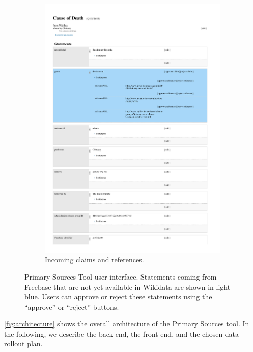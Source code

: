 \documentclass{sig-alternate-2013}
\begin{document}
\begin{figure}[!t]
\begin{subfigure}[b]{1.0\columnwidth}
        \includegraphics[width=\textwidth]{img/wikidata-cause-of-death.pdf}
        \caption{Incoming claims and references.}
        \label{fig:cause-of-death}
    \end{subfigure}
    \caption{Primary Sources Tool user interface. Statements coming from
       Freebase that are not yet available in Wikidata are shown in light blue.
       Users can approve or reject these statements using the ``approve'' or ``reject'' buttons.}
    \label{fig:primary-sources-tool}
\end{figure}

\autoref{fig:architecture} shows the overall architecture of the Primary Sources tool.
In the following, we describe the back-end, the front-end, and the chosen data rollout plan.
\end{document}
